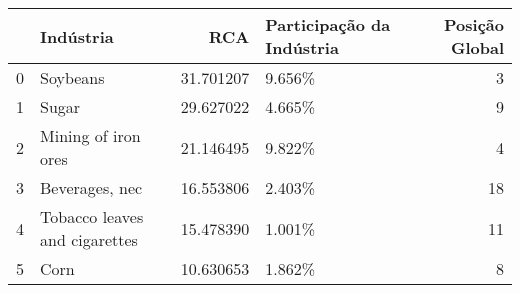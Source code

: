 \begin{tabular}{llrlr}
\toprule
{} &                      Indústria &        RCA & Participação da Indústria &  Posição Global \\
\midrule
0 &                       Soybeans &  31.701207 &                    9.656\% &               3 \\
1 &                          Sugar &  29.627022 &                    4.665\% &               9 \\
2 &            Mining of iron ores &  21.146495 &                    9.822\% &               4 \\
3 &                 Beverages, nec &  16.553806 &                    2.403\% &              18 \\
4 &  Tobacco leaves and cigarettes &  15.478390 &                    1.001\% &              11 \\
5 &                           Corn &  10.630653 &                    1.862\% &               8 \\
\bottomrule
\end{tabular}

